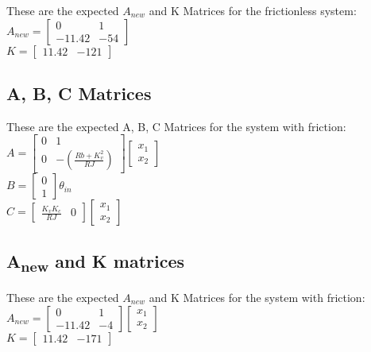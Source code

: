 \documentclass{homework}
\begin{document}
These are the expected $A_{new}$ and K Matrices for the frictionless system:\\
$A_{new} = \begin{bmatrix}
0 & 1\\
-11.42 & -54
\end{bmatrix}$
\\
$K = \begin{bmatrix}
11.42 & -121
\end{bmatrix}$
\subsection*{A, B, C Matrices}
These are the expected A, B, C Matrices for the system with friction:\\
$A = \begin{bmatrix}
0 & 1\\
0 & -(\frac{Rb + K_v^2}{RJ})
\end{bmatrix}\begin{bmatrix}
x_1\\
x_2
\end{bmatrix}$
\\
$B = \begin{bmatrix}
0\\
1
\end{bmatrix}\theta_{in}$
\\
$C = \begin{bmatrix}
\frac{K_vK_c}{RJ} & 0
\end{bmatrix}\begin{bmatrix}
x_1\\
x_2
\end{bmatrix}
$

\subsection*{A\textsubscript{new} and K matrices}

These are the expected $A_{new}$ and K Matrices for the system with friction:\\
$A_{new} = \begin{bmatrix}
0 & 1\\
-11.42 & -4
\end{bmatrix}\begin{bmatrix}
x_1\\
x_2
\end{bmatrix}$
\\
$K = \begin{bmatrix}
11.42 & -171
\end{bmatrix}$
\end{document}
